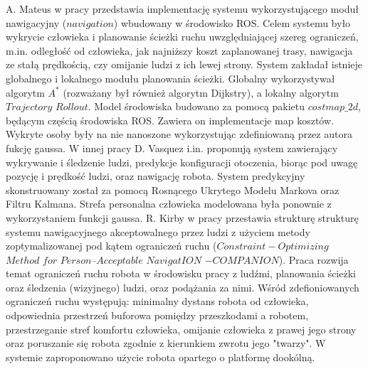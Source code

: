 A. Mateus w pracy \cite{nrs} przedstawia implementację systemu wykorzystującego moduł nawigacyjny ($navigation$) wbudowany w środowisko ROS. Celem systemu było wykrycie człowieka i planowanie ścieżki ruchu uwzględniającej szereg ograniczeń, m.in. odległość od człowieka, jak najniższy koszt zaplanowanej trasy, nawigacja ze stałą prędkością, czy omijanie ludzi z ich lewej strony. System zakładał istnieje globalnego i lokalnego modułu planowania ścieżki. Globalny wykorzystywał algorytm $A^*$ (rozważany był również algorytm Dijkstry), a lokalny algorytm $Trajectory$ $Rollout$. Model środowiska budowano za pomocą pakietu $costmap\_2d$, będącym częścią środowiska ROS. Zawiera on implementacje map kosztów. Wykryte osoby były na nie nanoszone wykorzystując zdefiniowaną przez autora fukcję gaussa. W innej pracy \cite{gauss_2} D. Vasquez i.in. proponują system zawierający wykrywanie i śledzenie ludzi, predykcje konfiguracji otoczenia, biorąc pod uwagę pozycję i prędkość ludzi, oraz nawigację robota. System predykcyjny skonstruowany został za pomocą Rosnącego Ukrytego Modelu Markova \cite{markov} oraz Filtru Kalmana. Strefa personalna człowieka modelowana była ponownie z wykorzystaniem funkcji gaussa. R. Kirby w pracy \cite{survey_3} przestawia strukturę strukturę systemu nawigacyjnego akceptowalnego przez ludzi z użyciem metody zoptymalizowanej pod kątem ograniczeń ruchu ($Constraint-Optimizing$
$Method$ $for$ $Person–Acceptable$ $NavigatION$ $- COMPANION$). Praca rozwija temat ograniczeń ruchu robota w środowisku pracy z ludźmi, planowania ścieżki oraz śledzenia (wizyjnego) ludzi, oraz podążania za nimi. Wśród zdefioniowanych ograniczeń ruchu występują: minimalny dystans robota od człowieka, odpowiednia przestrzeń buforowa pomiędzy przeszkodami a robotem, przestrzeganie stref komfortu człowieka, omijanie człowieka z prawej jego strony oraz poruszanie się robota zgodnie z kierunkiem zwrotu jego "twarzy". W systemie zaproponowano użycie robota opartego o platformę dookólną.
    
    
